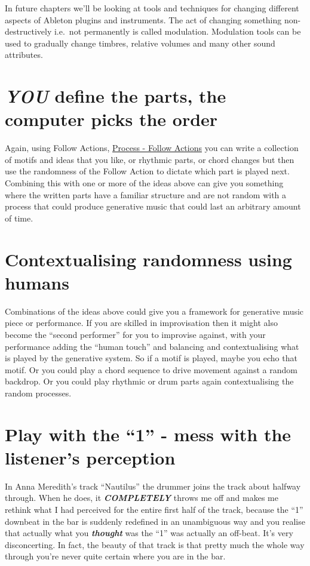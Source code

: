 \documentclass[
  12pt,
  letterpaper,
  oneside,
  open=any]{scrbook}
\begin{document}
In future chapters we'll be looking at tools and techniques for changing
different aspects of Ableton plugins and instruments. The act of
changing something non-destructively i.e.~not permanently is called
modulation. Modulation tools can be used to gradually change timbres,
relative volumes and many other sound attributes.

\section{\texorpdfstring{\textbf{\emph{YOU}} define the parts, the
computer picks the
order}{YOU define the parts, the computer picks the order}}\label{you-define-the-parts-the-computer-picks-the-order}

Again, using Follow Actions,
\hyperref[003-Process-Follow_Actions]{Process - Follow Actions} you can
write a collection of motifs and ideas that you like, or rhythmic parts,
or chord changes but then use the randomness of the Follow Action to
dictate which part is played next. Combining this with one or more of
the ideas above can give you something where the written parts have a
familiar structure and are not random with a process that could produce
generative music that could last an arbitrary amount of time.

\section{Contextualising randomness using
humans}\label{contextualising-randomness-using-humans}

Combinations of the ideas above could give you a framework for
generative music piece or performance. If you are skilled in
improvisation then it might also become the ``second performer'' for you
to improvise against, with your performance adding the ``human touch''
and balancing and contextualising what is played by the generative
system. So if a motif is played, maybe you echo that motif. Or you could
play a chord sequence to drive movement against a random backdrop. Or
you could play rhythmic or drum parts again contextualising the random
processes.

\section{Play with the ``1'' - mess with the listener's
perception}\label{play-with-the-1---mess-with-the-listeners-perception}

In Anna Meredith's track ``Nautilus'' the drummer joins the track about
halfway through. When he does, it \textbf{\emph{COMPLETELY}} throws me
off and makes me rethink what I had perceived for the entire first half
of the track, because the ``1'' downbeat in the bar is suddenly
redefined in an unambiguous way and you realise that actually what you
\textbf{\emph{thought}} was the ``1'' was actually an off-beat. It's
very disconcerting. In fact, the beauty of that track is that pretty
much the whole way through you're never quite certain where you are in
the bar.
\end{document}
